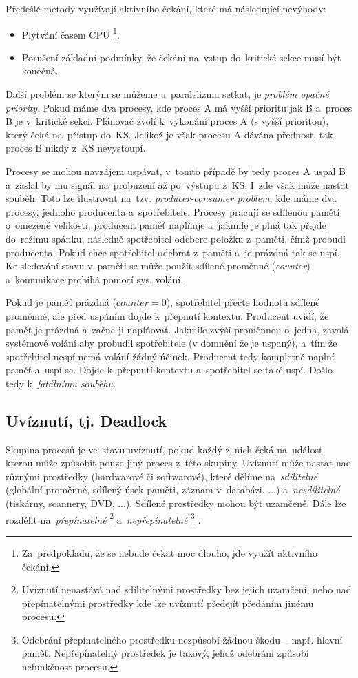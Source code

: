 Předešlé metody využívají aktivního čekání, které má následující nevýhody:

\begin{itemize}
	\item Plýtvání časem CPU%
	\footnote{Za~předpokladu, že se nebude čekat moc dlouho, jde využít aktivního čekání.}.
	\item Porušení základní podmínky, že čekání na~vstup do~kritické sekce musí být konečná.
\end{itemize}

Další problém se kterým se můžeme u~paralelizmu setkat, je \emph{problém opačné priority}. Pokud máme dva procesy, kde proces A má vyšší prioritu jak B a~proces B je v~kritické sekci. Plánovač zvolí k~vykonání proces A (s vyšší prioritou), který čeká na~přístup do~KS. Jelikož je však procesu A dávána přednost, tak proces B nikdy z~KS nevystoupí.

Procesy se mohou navzájem uspávat, v~tomto případě by tedy proces A uspal B a~zaslal by mu signál na~probuzení až po~výstupu z~KS. I~zde však může nastat souběh. Toto lze ilustrovat na~tzv. \emph{producer-consumer problem}, kde máme dva procesy, jednoho producenta a~spotřebitele. Procesy pracují se sdílenou pamětí o~omezené velikosti, producent paměť naplňuje a~jakmile je plná tak přejde do~režimu spánku, následně spotřebitel odebere položku z~paměti, čímž probudí producenta. Pokud chce spotřebitel odebrat z~paměti a~je prázdná tak se uspí. Ke sledování stavu v~paměti se může použít sdílené proměnné (\emph{counter}) a~komunikace probíhá pomocí sys. volání.

Pokud je paměť prázdná ($counter = 0$), spotřebitel přečte hodnotu sdílené proměnné, ale před uspáním dojde k~přepnutí kontextu. Producent uvidí, že paměť je prázdná a~začne ji naplňovat. Jakmile zvýší proměnnou o~jedna, zavolá systémové volání aby probudil spotřebitele (v domnění že je uspaný), a~tím že spotřebitel nespí nemá volání žádný účinek. Producent tedy kompletně naplní paměť a~uspí se. Dojde k~přepnutí kontextu a~spotřebitel se také uspí. Došlo tedy k~\emph{fatálnímu souběhu}.

\subsection{Uvíznutí, tj. Deadlock}

Skupina procesů je ve~stavu uvíznutí, pokud každý z~nich čeká na~událost, kterou může způsobit pouze jiný proces z~této skupiny. Uvíznutí může nastat nad různými prostředky (hardwarové či softwarové), které dělíme na~\emph{sdílitelné} (globální proměnné, sdílený úsek paměti, záznam v~databázi, ...) a~\emph{nesdílitelné} (tiskárny, scannery, DVD, ...). Sdílené prostředky mohou být uzamčené. Dále lze rozdělit na~\emph{přepínatelné}%
\footnote{Uvíznutí nenastává nad sdílitelnými prostředky bez jejich uzamčení, nebo nad přepínatelnými prostředky kde lze uvíznutí předejít předáním jinému procesu.} %
a~\emph{nepřepínatelné}%
\footnote{Odebrání přepínatelného prostředku nezpůsobí žádnou škodu -- např. hlavní paměť. Nepřepínatelný prostředek je takový, jehož odebrání způsobí nefunkčnost procesu.}%
.


